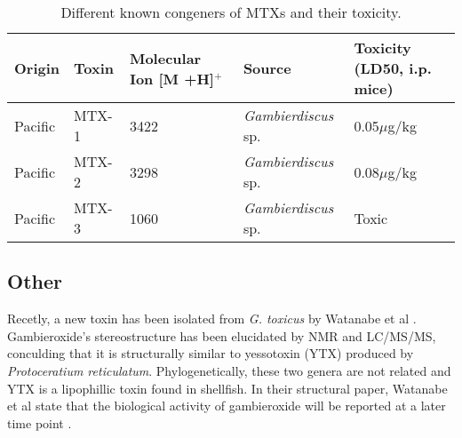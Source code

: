 
\begin{table}
\caption{Different known congeners of MTXs and their toxicity.}
\begin{tabular}{ |  p{2cm} | p{2cm} | p{3cm} | p{3cm} | p{4cm} | }
\hline
\textbf{Origin} & \textbf{Toxin} & \textbf{Molecular Ion [M +H]$^{+}$} & \textbf{Source} & \textbf{Toxicity (LD50, i.p. mice)} \\
\hline
 Pacific & MTX-1 & 3422 \cite{holmes1994purification,murata1993structure} & \emph{Gambierdiscus} sp. \cite{holmes1994purification} & 0.05$\mu$g/kg \cite{murata1993structure}\\
\hline
 Pacific & MTX-2 & 3298 \cite{holmes1994purification} & \emph{Gambierdiscus} sp. \cite{holmes1994purification} & 0.08$\mu$g/kg \cite{holmes1994purification}\\
\hline
 Pacific & MTX-3 & 1060   \cite{holmes1994purification} & \emph{Gambierdiscus} sp. \cite{holmes1994purification} & Toxic \cite{holmes1994purification} \\
\hline
\end{tabular}
\end{table}
\FloatBarrier

\subsection{Other}
Recetly, a new toxin has been isolated from \emph{G. toxicus} by Watanabe et al \cite{watanabe2013gambieroxide}. Gambieroxide's stereostructure has been elucidated by NMR and LC/MS/MS, conculding that it is structurally similar to yessotoxin (YTX) produced by \emph{Protoceratium reticulatum}. Phylogenetically, these two genera are not related and YTX is a lipophillic toxin found in shellfish. In their structural paper, Watanabe et al state that the biological activity of gambieroxide will be reported at a later time point \cite{watanabe2013gambieroxide}.

